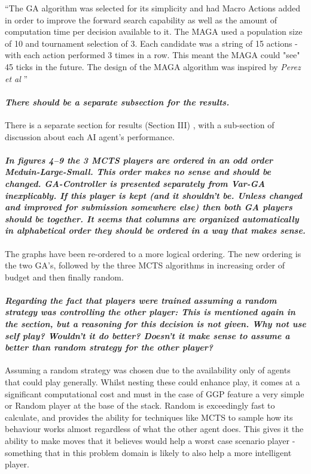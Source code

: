 \documentclass{article}
\begin{document}
``The GA algorithm was selected for its simplicity and had Macro Actions added in order to improve the forward search capability as well as the amount of computation time per decision available to it. The MAGA used a population size of 10 and tournament selection of 3. Each candidate was a string of 15 actions - with each action performed 3 times in a row. This meant the MAGA could "see" 45 ticks in the future. The design of the MAGA algorithm was inspired by \textit{Perez et al} \cite{perez2013rolling}''
\paragraph*{\textit{There should be a separate subsection for the results.}}
There is a separate section for results (Section III) , with a sub-section of discussion about each AI agent's performance.
\paragraph*{\textit{In figures 4--9 the 3 MCTS players are ordered in an odd order Meduin-Large-Small. This order makes no sense and should be changed. GA-Controller is presented separately from Var-GA inexplicably. If this player is kept (and it shouldn't be. Unless changed and improved for submission somewhere else) then both GA players should be together. It seems that columns are organized automatically in alphabetical order they should be ordered in a way that makes sense.}}
The graphs have been re-ordered to a more logical ordering. The new ordering is the two GA's, followed by the three MCTS algorithms in increasing order of budget and then finally random.
\paragraph*{\textit{Regarding the fact that players were trained assuming a random strategy was controlling the other player: This is mentioned again in the section, but a reasoning for this decision is not given. Why not use self play? Wouldn't it do better? Doesn't it make sense to assume a better than random strategy for the other player?}}
Assuming a random strategy was chosen due to the availability only of agents that could play generally. Whilst nesting these could enhance play, it comes at a significant computational cost and must in the case of GGP feature a very simple or Random player at the base of the stack. Random is exceedingly fast to calculate, and provides the ability for techniques like MCTS to sample how its behaviour works almost regardless of what the other agent does. This gives it the ability to make moves that it believes would help a worst case scenario player - something that in this problem domain is likely to also help a more intelligent player.
\end{document}
